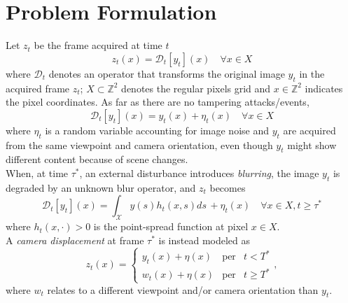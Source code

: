\documentclass{llncs}
\begin{document}

% 
%
%
%
\section{Problem Formulation}\label{sec:probForm}
%
Let $z_t$ be the frame acquired at time $t$
\begin{equation}
\label{eq:observationModel}
z_t(x)=\mathcal{D}_t[y_t](x) \quad \forall x \in X
\end{equation}
where $\mathcal{D}_t$ denotes an operator that transforms the original image $y_t$ in the acquired frame $z_t$; $X \subset \mathbb{Z}^2$ denotes the regular pixels grid and $x\in \mathbb{Z}^2$ indicates the pixel coordinates. As far as there are no tampering attacks/events,
\begin{equation}
\label{eq:no_tampering}
\mathcal{D}_t[y_t](x) = y_t(x) + \eta_t(x) \quad \forall x \in X
\end{equation}
where $\eta_t$ is a random variable accounting for image noise and $y_t$ are acquired from the same viewpoint and camera orientation, even though $y_t$ might show different content because of scene changes.\\
When, at time $\tau^*$, an external disturbance introduces \emph{blurring}, the image $y_t$ is degraded by an unknown blur operator, and $z_t$ becomes
\begin{equation}
\label{eq:model_defocus}
\mathcal{D}_t[y_t](x) = \int_{\mathcal{X}}y(s)h_t(x,s)ds\, + \eta_t(x) \quad \forall x \in X, t \geq \tau^*
\end{equation}
where $h_t(x,\cdot) > 0$ is the point-spread function at pixel $x \in X$.\\
A \emph{camera displacement} at frame $\tau^*$ is instead modeled as 
\begin{equation}
\label{eq:model_displacement}
z_t(x)  = \left\{ \begin{array}{rcl}
y_t(x) + \eta(x) & \mbox{per} & t < T^* \\
w_t(x) + \eta(x) & \mbox{per} & t \geqslant T^*
\end{array}\right. ,
\end{equation}
where $w_t$ relates to a different viewpoint and/or camera orientation than $y_t$. 
\end{document}
